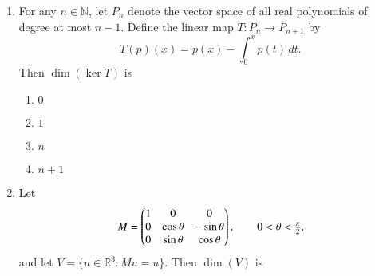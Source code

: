 \documentclass[journal,12pt,onecolumn]{IEEEtran}
\theoremstyle{remark}
\begin{document}
\begin{enumerate}
\begin{enumerate}[label=(\Alph*)]
\end{enumerate}

\item For any \(n\in\mathbb{N}\), let \(P_n\) denote the vector space of all real polynomials of degree at most \(n-1\).  
Define the linear map \(T:P_n\to P_{n+1}\) by
\[
T(p)(x)=p(x)-\int_0^x p(t)\,dt.
\]
Then \(\dim(\ker T)\) is
\\[-0.3em]\makebox[\textwidth][r]{\textit{[GATE EE 2025]}}

\begin{enumerate}[label=(\Alph*)]
\item \(0\)
\item \(1\)
\item \(n\)
\item \(n+1\)
\end{enumerate}

\item Let
\[
M=\begin{pmatrix}
1 & 0 & 0\\
0 & \cos\theta & -\sin\theta\\
0 & \sin\theta & \cos\theta
\end{pmatrix},\qquad 0<\theta<\tfrac{\pi}{2},
\]
and let \(V=\{u\in\mathbb{R}^3:Mu=u\}\). Then \(\dim(V)\) is
\\[-0.3em]\makebox[\textwidth][r]{\textit{[GATE EE 2025]}}


\end{enumerate}
\end{document}
